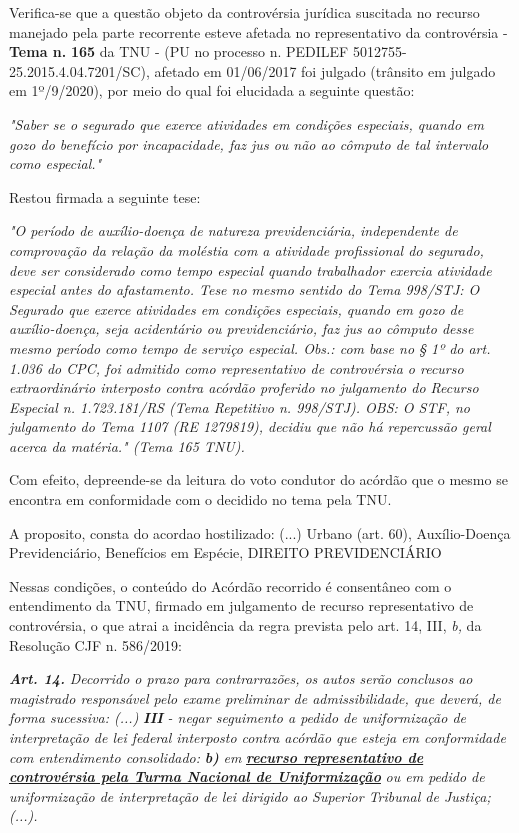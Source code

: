 \documentclass[12pt]{article}
\begin{document}
\justifying
\noindent Verifica-se que a questão objeto da controvérsia jurídica suscitada no recurso manejado pela parte recorrente esteve afetada no representativo da controvérsia - \textbf{Tema n. }\textbf{165} da TNU - (PU no processo n. PEDILEF 5012755-25.2015.4.04.7201/SC),  afetado em 01/06/2017 foi julgado (trânsito em julgado em 1º/9/2020), por meio do qual foi elucidada a seguinte questão:

\noindent \textit{"Saber se o segurado que exerce atividades em condições especiais, quando em gozo do benefício por incapacidade, faz jus ou não ao cômputo de tal intervalo como especial."}

\noindent Restou firmada a seguinte tese:

\noindent \textit{"O período de auxílio-doença de natureza previdenciária, independente de comprovação da relação da moléstia com a atividade profissional do segurado, deve ser considerado como tempo especial quando trabalhador exercia atividade especial antes do afastamento. Tese no mesmo sentido do Tema 998/STJ: O Segurado que exerce atividades em condições especiais, quando em gozo de auxílio-doença, seja acidentário ou previdenciário, faz jus ao cômputo desse mesmo período como tempo de serviço especial. Obs.: com base no § 1º do art. 1.036 do CPC, foi admitido como representativo de controvérsia o recurso extraordinário interposto contra acórdão proferido no julgamento do Recurso Especial n. 1.723.181/RS (Tema Repetitivo n. 998/STJ). OBS: O STF, no julgamento do Tema 1107 (RE 1279819), decidiu que não há repercussão geral acerca da matéria." (Tema 165 TNU).}

\noindent Com efeito, depreende-se da leitura do voto condutor do acórdão que o mesmo se encontra em conformidade com o decidido no  tema pela TNU.

\noindent A proposito, consta do acordao hostilizado: (...) Urbano (art. 60), Auxílio-Doença Previdenciário, Benefícios em Espécie, DIREITO PREVIDENCIÁRIO

\noindent Nessas condições, o conteúdo do Acórdão recorrido é consentâneo com o entendimento da TNU, firmado em julgamento de recurso representativo de controvérsia, o que atrai a incidência da regra prevista pelo art. 14, III, \textit{b,} da Resolução CJF n. 586/2019:

\noindent \textit{\textbf{Art. 14.}}\textit{ Decorrido o prazo para contrarrazões, os autos serão conclusos ao magistrado responsável pelo exame preliminar de admissibilidade, que deverá, de forma sucessiva: (...) }\textit{\textbf{III }}\textit{- negar seguimento a pedido de uniformização de interpretação de lei federal interposto contra acórdão que esteja em conformidade com entendimento consolidado: }\textit{\textbf{b)}}\textit{ em }\uline{\textit{\textbf{recurso representativo de controvérsia pela Turma Nacional de Uniformização}}}\textit{ ou em pedido de uniformização de interpretação de lei dirigido ao Superior Tribunal de Justiça;(...).}
\end{document}
